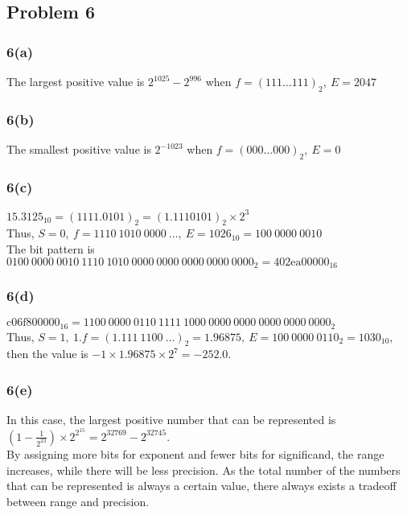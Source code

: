 \documentclass{article}
\begin{document}
\subsection*{Problem 6}
\subsubsection*{6(a)}
The largest positive value is $2^{1025} - 2^{996}$ when $ f = (111 \dots 111)_{2},\ E = 2047 $
\subsubsection*{6(b)}
The smallest positive value is $2^{-1023}$ when $ f = (000 \dots 000)_{2},\ E = 0 $

\subsubsection*{6(c)}
$15.3125_{10} = (1111.0101)_{2} = (1.1110101)_{2} \times 2^{3}$ \\
Thus, $ S = 0,\ f = 1110\ 1010\ 0000\ \dots,\ E = 1026_{10} = 100\ 0000\ 0010$ \\
The bit pattern is $0100\ 0000\ 0010\ 1110\ 1010\ 0000\ 0000\ 0000\ 0000\ 0000_{2} = \text{402ea00000} _{16}$
\subsubsection*{6(d)}
$\text{c06f800000} _{16} = 1100\ 0000\ 0110\ 1111\ 1000\ 0000\ 0000\ 0000\ 0000\ 0000_{2}$ \\
Thus, $ S = 1,\ 1.f = (1.111\ 1100\ \dots)_{2} = 1.96875,\ E = 100\ 0000\ 0110_{2} = 1030_{10}$, then the value is $ -1 \times 1.96875 \times 2^{7} = -252.0$.
\subsubsection*{6(e)}
In this case, the largest positive number that can be represented is \\ $(1 - \frac{1}{2^{23}}) \times 2^{2^15} = 2^{32769} - 2^{32745}$. \\
By assigning more bits for exponent and fewer bits for significand, the range increases, while there will be less precision.
As the total number of the numbers that can be represented is always a certain value, there always exists a tradeoff between range and precision.
\end{document}
